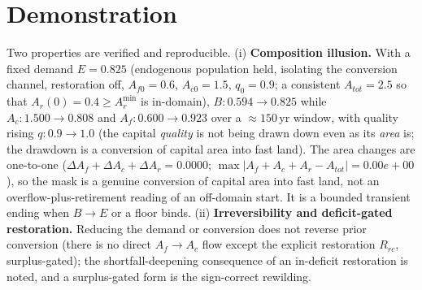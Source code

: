 \documentclass[11pt]{article}
\begin{document}
\section{Demonstration}

Two properties are verified and reproducible. (i) \textbf{Composition illusion.} With a fixed demand $E=0.825$ (endogenous population held, isolating the conversion channel, restoration off, $A_{f0}=0.6$, $A_{c0}=1.5$, $q_0=0.9$; a consistent $A_{tot}=2.5$ so that $A_r(0)=0.4\ge A_r^{\min}$ is in-domain), $B:0.594\to0.825$ while $A_c:1.500\to0.808$ and $A_f:0.600\to0.923$ over a $\approx150$\,yr window, with quality rising $q:0.9\to1.0$ (the capital \emph{quality} is not being drawn down even as its \emph{area} is; the drawdown is a conversion of capital area into fast land). The area changes are one-to-one ($\Delta A_f+\Delta A_c+\Delta A_r=0.0000$; $\max|A_f+A_c+A_r-A_{tot}|=0.00e{+}00$), so the mask is a genuine conversion of capital area into fast land, not an overflow-plus-retirement reading of an off-domain start. It is a bounded transient ending when $B\to E$ or a floor binds. (ii) \textbf{Irreversibility and deficit-gated restoration.} Reducing the demand or conversion does not reverse prior conversion (there is no direct $A_f\to A_c$ flow except the explicit restoration $R_{rc}$, surplus-gated); the shortfall-deepening consequence of an in-deficit restoration is noted, and a surplus-gated form is the sign-correct rewilding.
\end{document}
